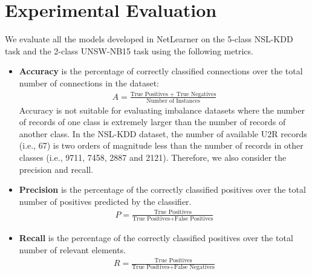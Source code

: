 \section{Experimental Evaluation}

We evaluate all the models developed in NetLearner on the 5-class NSL-KDD task and the 2-class UNSW-NB15 task using the following metrics.
\begin{itemize}
    \item \textbf{Accuracy} is the percentage of correctly classified connections
        over the total number of connections in the dataset:
        \begin{align}
            A = \frac{\text{True Positives + True Negatives}}{\text{Number of Instances}}
        \end{align} 
        Accuracy is not suitable for evaluating imbalance datasets where the number
        of records of one class is extremely larger than the number of
        records of another class.
        In the NSL-KDD dataset, the number of available U2R records (i.e., 67)
        is two orders of magnitude less than the number of records in other classes
        (i.e., 9711, 7458, 2887 and 2121).
        Therefore, we also consider the precision and recall.
    \item \textbf{Precision} is the percentage of the correctly classified positives over
        the total number of positives predicted by the classifier.
                \begin{align}
                    P = \frac{\text{True Positives}}{\text{True Positives} + \text{False Positives}}
                \end{align}
    \item \textbf{Recall} is the percentage of the correctly classified positives over
        the total number of relevant elements.
                \begin{align}
                    R = \frac{\text{True Positives}}{\text{True Positives} + \text{False Negatives}}
                \end{align}
\end{itemize}

